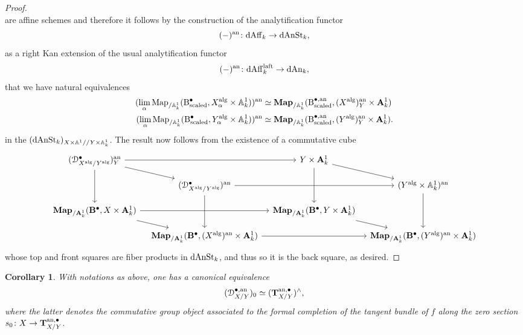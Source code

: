 \documentclass[10pt,a4paper,reqno]{amsart} %
\theoremstyle{plain}
\newtheorem{cor}[thm]{Corollary}
\theoremstyle{definition}
\theoremstyle{remark}
\numberwithin{equation}{section}
\begin{document}
\begin{proof}
\[        \]
    are affine schemes and therefore it follows by the construction of the analytification functor
        \[
            (-)^\mathrm{an} \colon \mathrm{dAff}_k \to \mathrm{dAnSt}_k,  
        \]
    as a right Kan extension of the usual analytification functor
        \[
            (-)^\mathrm{an} \colon \mathrm{dAff}^{\mathrm{laft}}_k \to \mathrm{dAn}_k,  
        \]
    that we have natural equivalences
        \begin{align*}
           ( \lim_\alpha \operatorname{Map}_{/\mathbb A^1_k}(\mathrm{B}^\bullet_\mathrm{scaled}, X_\alpha^\mathrm{alg} \times \mathbb A^1_k)) ^\mathrm{an} & \simeq \mathbf{Map}_{/\mathbb A^1_k}(\mathrm{B}^{\bullet, \mathrm{an}}_\mathrm{scaled}, (X^\mathrm{alg})^\mathrm{an}_Y \times \mathbf A^1_k) \\
           ( \lim_\alpha \operatorname{Map}_{/\mathbb A^1_k}(\mathrm{B}^\bullet_\mathrm{scaled}, Y_\alpha^\mathrm{alg} \times \mathbb A^1_k)) ^\mathrm{an} & \simeq \mathbf{Map}_{/\mathbb A^1_k}(\mathrm{B}^{\bullet, \mathrm{an}}_\mathrm{scaled}, (Y^\mathrm{alg})^\mathrm{an}_Y \times \mathbf A^1_k).
        \end{align*}
    in the \infcat $(\mathrm{dAnSt}_k)_{X \times \mathbb A^1/ /Y \times \mathbb A^1_k}$.
    The result now follows from the existence of a commutative cube
        \[
        \begin{tikzcd}[column sep=0.125in,row sep=0.125in]
            (\cD_{X\alg/ Y\alg}^\bullet)\an_Y \ar{rr} \ar{dd} \ar{rd} &  & Y \times \bA^1_k \ar{rd} \ar{dd} & \\
            & (\cD_{X\alg/ Y\alg}^\bullet)\an \ar{rr} \ar{dd} &  & (Y\alg \times \bbA^1_k)\an \ar{dd} \\
            \bfMap_{/\bA^1_k}(\mathbf{B}^\bullet, X \times \bA^1_k) \ar{rr} \ar{rd} & & \bfMap_{/\bA^1_k}(\mathbf{B}^\bullet, Y \times \bA^1_k) \ar{rd} \\
            & \bfMap_{/\bA^1_k}(\mathbf{B}^\bullet, (X\alg)\an \times \bA^1_k) \ar{rr} &  & \bfMap_{/\bA^1_k}(\mathbf{B}^\bullet, (Y\alg)\an \times \bA^1_k)
        \end{tikzcd}
        \]
    whose top and front squares are fiber products in $\mathrm{dAnSt}_k$, and thus so it is the back square, as desired.
\end{proof}




\begin{cor} \label{cor:analytic_def_fiber_at_0_is_tangent} With notations as above, one has a canonical equivalence
        \[
            (\mathcal D^{\bullet, \mathrm{an}}_{X/Y})_0 \simeq (\mathbf T^{\mathrm{an}, \bullet}_{X/Y})^\wedge ,
        \]
    where the latter denotes the commutative group object associated to the formal completion of the tangent bundle of $f$ along the zero section $s_0 \colon
    X \to \mathbf T^{\mathrm{an}, \bullet}_{X/Y}$.
\end{cor}
\end{document}
